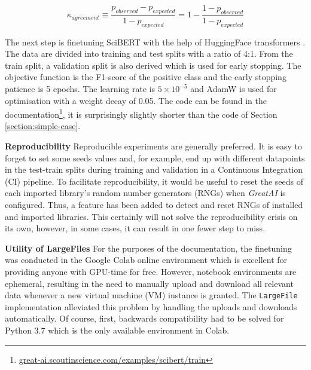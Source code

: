 \begin{equation} \label{equation:kappa}
\kappa_{agreement} \equiv \frac{p_{observed} - p_{expected}}{1 - p_{expected}} = 1 - \frac{1 - p_{observed}}{1 - p_{expected}} 
\end{equation}

The next step is finetuning SciBERT with the help of HuggingFace transformers \cite{wolf2019huggingface}. The data are divided into training and test splits with a ratio of 4:1. From the train split, a validation split is also derived which is used for early stopping. The objective function is the F1-score of the positive class and the early stopping patience is 5 epochs. The learning rate is $5 \times 10^{-5}$ and AdamW \cite{loshchilov2017decoupled} is used for optimisation with a weight decay of 0.05. The code can be found in the documentation\footnote{\href{https://great-ai.scoutinscience.com/examples/scibert/train/}{great-ai.scoutinscience.com/examples/scibert/train}}, it is surprisingly slightly shorter than the code of Section \ref{section:simple-case}.

\begin{displayquote}
\textbf{Reproducibility} Reproducible experiments are generally preferred. It is easy to forget to set some seeds values and, for example, end up with different datapoints in the test-train splits during training and validation in a Continuous Integration (CI) pipeline. To facilitate reproducibility, it would be useful to reset the seeds of each imported library's random number generators (RNGs) when \textit{GreatAI} is configured. Thus, a feature has been added to detect and reset RNGs of installed and imported libraries. This certainly will not solve the reproducibility crisis \cite{hutson2018artificial} on its own, however, in some cases, it can result in one fewer step to miss.
\end{displayquote}

\begin{displayquote}
\textbf{Utility of LargeFiles} For the purposes of the documentation, the finetuning was conducted in the Google Colab online environment which is excellent for providing anyone with GPU-time for free. However, notebook environments are ephemeral, resulting in the need to manually upload and download all relevant data whenever a new virtual machine (VM) instance is granted. The \texttt{LargeFile} implementation alleviated this problem by handling the uploads and downloads automatically. Of course, first, backwards compatibility had to be solved for Python 3.7 which is the only available environment in Colab.
\end{displayquote}

